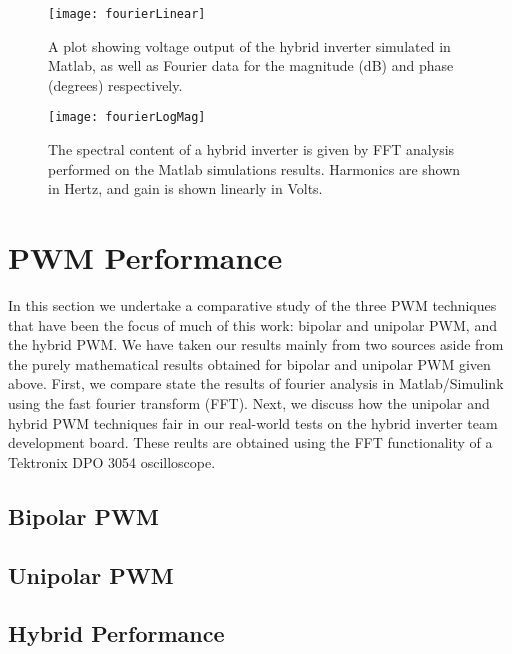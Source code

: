 \begin{figure}
\centering
\texttt{[image: fourierLinear]}
\caption{A plot showing voltage output of the hybrid inverter simulated in Matlab, as well as Fourier data for the magnitude (dB) and phase (degrees) respectively.}
\label{fourierLinear}
\end{figure}

\begin{figure}
\centering
\texttt{[image: fourierLogMag]}
\caption{The spectral content of a hybrid inverter is given by FFT analysis performed on the Matlab simulations results. Harmonics are shown in Hertz, and gain is shown linearly in Volts.}
\label{fourierLogMag}
\end{figure}

\section{PWM Performance}
In this section we undertake a comparative study of the three PWM techniques that have been the focus of much of this work: bipolar and unipolar PWM, and the hybrid PWM. We have taken our results mainly from two sources aside from the purely mathematical results obtained for bipolar and unipolar PWM given above. First, we compare state the results of fourier analysis in Matlab/Simulink using the fast fourier transform (FFT). Next, we discuss how the unipolar and hybrid PWM techniques fair in our real-world tests on the hybrid inverter team development board. These reults are obtained using the FFT functionality of a Tektronix DPO 3054 oscilloscope.

\subsection{Bipolar PWM}


\subsection{Unipolar PWM}

\subsection{Hybrid Performance}

